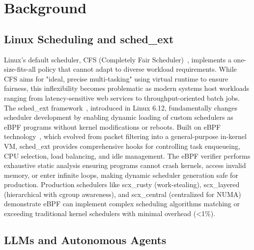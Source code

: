 \section{Background}

\subsection{Linux Scheduling and sched\_ext}

Linux's default scheduler, CFS (Completely Fair Scheduler)~\cite{wong2008cfs}, implements a one-size-fits-all policy that cannot adapt to diverse workload requirements. While CFS aims for "ideal, precise multi-tasking" using virtual runtime to ensure fairness, this inflexibility becomes problematic as modern systems host workloads ranging from latency-sensitive web services to throughput-oriented batch jobs. The sched\_ext framework~\cite{schedext2024}, introduced in Linux 6.12, fundamentally changes scheduler development by enabling dynamic loading of custom schedulers as eBPF programs without kernel modifications or reboots. Built on eBPF technology~\cite{mccanne1993bpf,gregg2019bpf}, which evolved from packet filtering into a general-purpose in-kernel VM, sched\_ext provides comprehensive hooks for controlling task enqueueing, CPU selection, load balancing, and idle management. The eBPF verifier performs exhaustive static analysis ensuring programs cannot crash kernels, access invalid memory, or enter infinite loops, making dynamic scheduler generation safe for production. Production schedulers like scx\_rusty (work-stealing), scx\_layered (hierarchical with cgroup awareness), and scx\_central (centralized for NUMA) demonstrate eBPF can implement complex scheduling algorithms matching or exceeding traditional kernel schedulers with minimal overhead (<1\%).

\subsection{LLMs and Autonomous Agents}


